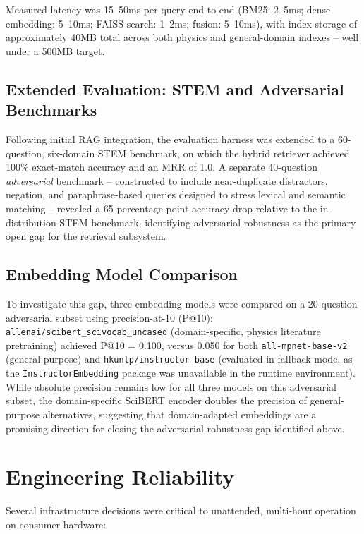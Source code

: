 \documentclass[11pt]{article}
\begin{document}
Measured latency was 15--50ms per query end-to-end (BM25: 2--5ms; dense
embedding: 5--10ms; FAISS search: 1--2ms; fusion: 5--10ms), with index
storage of approximately 40MB total across both physics and general-domain
indexes -- well under a 500MB target.

\subsection{Extended Evaluation: STEM and Adversarial Benchmarks}
Following initial RAG integration, the evaluation harness was extended to a
60-question, six-domain STEM benchmark, on which the hybrid retriever
achieved 100\% exact-match accuracy and an MRR of 1.0. A separate
40-question \emph{adversarial} benchmark -- constructed to include
near-duplicate distractors, negation, and paraphrase-based queries designed
to stress lexical and semantic matching -- revealed a 65-percentage-point
accuracy drop relative to the in-distribution STEM benchmark, identifying
adversarial robustness as the primary open gap for the retrieval subsystem.

\subsection{Embedding Model Comparison}
To investigate this gap, three embedding models were compared on a
20-question adversarial subset using precision-at-10 (P@10):
\texttt{allenai/scibert\_scivocab\_uncased} (domain-specific, physics
literature pretraining) achieved P@10 = 0.100, versus 0.050 for both
\texttt{all-mpnet-base-v2} (general-purpose) and
\texttt{hkunlp/instructor-base} (evaluated in fallback mode, as the
\texttt{InstructorEmbedding} package was unavailable in the runtime
environment). While absolute precision remains low for all three models on
this adversarial subset, the domain-specific SciBERT encoder doubles the
precision of general-purpose alternatives, suggesting that domain-adapted
embeddings are a promising direction for closing the adversarial robustness
gap identified above.

\section{Engineering Reliability}
Several infrastructure decisions were critical to unattended, multi-hour
operation on consumer hardware:
\end{document}
